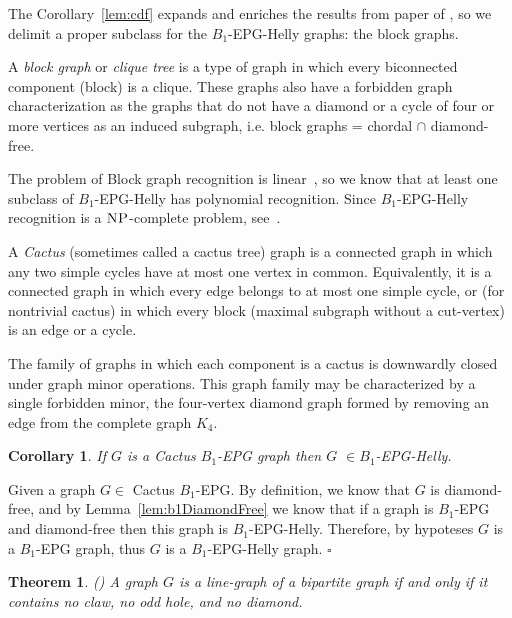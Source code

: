 \documentclass[9pt]{entcs}
\newtheorem{teo}{Theorem}[section]
\newtheorem{coro}{Corollary}[section]
\begin{document}
The Corollary~\ref{lem:cdf} expands and enriches the results from paper of \cite{ries2009}, so we delimit a proper subclass for the $B_1$-EPG-Helly graphs: the block graphs.

A \textit{block graph} or \textit{clique tree} is a type of graph in which every biconnected component (block) is a clique. These graphs also have a forbidden graph characterization as the graphs that do not have a diamond or a cycle of four or more vertices as an induced subgraph, i.e. block graphs = chordal $\cap$ diamond-free.

The problem of Block graph recognition is linear~\cite{tarjan1972depth}, so we know that at least one subclass of $B_1$-EPG-Helly has polynomial recognition. Since $B_1$-EPG-Helly recognition is a $\textsc{NP}$-complete problem, see~\cite{bornstein2019}.


A \textit{Cactus} (sometimes called a cactus tree)  graph is a connected graph in which any two simple cycles have at most one vertex in common. Equivalently, it is a connected graph in which every edge belongs to at most one simple cycle, or (for nontrivial cactus) in which every block (maximal subgraph without a cut-vertex) is an edge or a cycle.
 
 The family of graphs in which each component is a cactus is downwardly closed under graph minor operations. This graph family may be characterized by a single forbidden minor, the four-vertex diamond graph formed by removing an edge from the complete graph $K_4$.
 
\begin{coro}
If $G$ is a Cactus $B_1$-EPG graph then $G$ $\in B_1$-EPG-Helly.
\end{coro}
\begin{pf}
Given a graph $G \in $ Cactus $B_1$-EPG. By definition, we know that $G$ is diamond-free, and by Lemma~\ref{lem:b1DiamondFree} we know that if a graph is $B_1$-EPG and diamond-free then this graph is  $B_1$-EPG-Helly. Therefore, by hypoteses $G$ is a $B_1$-EPG graph, thus $G$ is a $B_1$-EPG-Helly graph.
$\square$\end{pf}
 



\begin{teo} (\cite{harary1974line})
A graph $G$ is a line-graph of a bipartite graph if and only if it
contains no claw, no odd hole, and no diamond.
\end{teo}
\end{document}
